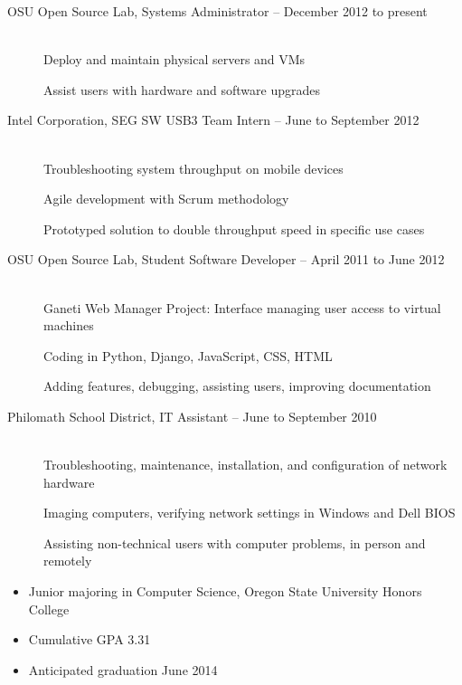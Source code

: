 \documentclass[11pt]{article}
\begin{document}
\begin{description}

\item[OSU Open Source Lab, Systems Administrator -- December 2012 to present]
    \hfill \\
    Deploy and maintain physical servers and VMs

    Assist users with hardware and software upgrades

\item[Intel Corporation, SEG SW USB3 Team Intern -- June to September
2012]
    \hfill \\
    Troubleshooting system throughput on mobile devices

    Agile development with Scrum methodology

    Prototyped solution to double throughput speed in specific use cases

\item[OSU Open Source Lab, Student Software Developer -- April 2011 to June
2012]
    \hfill \\
    Ganeti Web Manager Project: Interface managing user access to
    virtual machines

    Coding in Python, Django, JavaScript, CSS, HTML

    Adding features, debugging, assisting users, improving documentation

\item[Philomath School District, IT Assistant -- June to September 2010]
    \hfill \\
    Troubleshooting, maintenance, installation, and configuration of
    network hardware

    Imaging computers, verifying network settings in Windows and Dell
    BIOS

    Assisting non-technical users with computer problems, in person and
    remotely

\end{description}


\begin{itemize}

    \item Junior majoring in Computer Science, Oregon State University 
          Honors College

    \item Cumulative GPA 3.31

    \item Anticipated graduation June 2014

\end{itemize}
\end{document}
